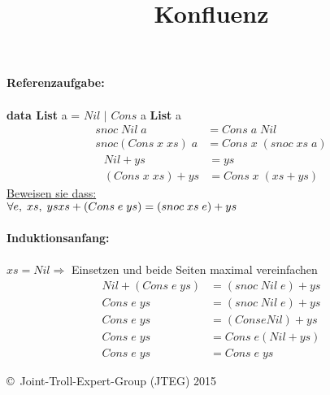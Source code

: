 \documentclass{article}
\title{Konfluenz}
\date{ }
\begin{document}
	\maketitle
	\textbf{Referenzaufgabe:} \\
		\\
		\textbf{data List} a = $Nil$ $|$ $Cons$ a \textbf{List} a
		\begin{align*}
			snoc\;Nil\;a 			&= Cons\;a\;Nil\\
			snoc(Cons\;x\;xs)\;a	&= Cons\;x\;(snoc\;xs\;a)
		\end{align*}
		\begin{align*}
			Nil + ys 			&= ys\\
			(Cons\;x\;xs) + ys 	&= Cons\;x\;(xs + ys)
		\end{align*}
		\underline{Beweisen sie dass:}\\
		$\forall e,\;xs,\;ys\\xs+(Cons\;e\;ys) = (snoc\;xs\;e)+ys$ \\\\
	\textbf{Induktionsanfang:}\\\\
		$xs = Nil$\;\;$\Rightarrow$ Einsetzen und beide Seiten maximal vereinfachen
	\begin{align*}
		Nil+(Cons\;e\;ys) 	&= (snoc\;Nil\;e)+ys\\
			 Cons\;e\;ys	&= (snoc\;Nil\;e)+ys\\
			 Cons\;e\;ys	&= (Cons e Nil) + ys\\
			 Cons\;e\;ys	&= Cons\;e (Nil + ys)\\
			 Cons\;e\;ys	&= Cons\;e\;ys
	\end{align*}
		
	\begin{tiny}
	\copyright\ Joint-Troll-Expert-Group (JTEG) 2015
	\end{tiny}
\end{document}

